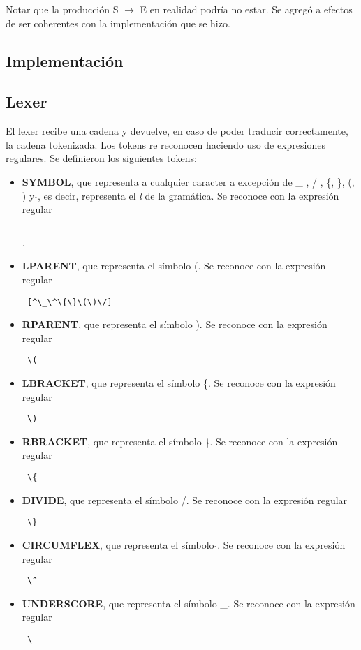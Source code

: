\indent Notar que la producción  S $\rightarrow$ E en realidad podría no estar. Se agregó a efectos de ser coherentes con la implementación que se hizo.\\ 

\subsection{Implementación}

\subsection{Lexer}

\indent \indent El lexer recibe una cadena y devuelve, en caso de poder traducir correctamente, la cadena tokenizada. Los tokens re reconocen haciendo uso de expresiones regulares. Se definieron los siguientes tokens:\\
\begin{itemize}
\item \textbf{SYMBOL}, que representa a cualquier caracter a excepción de \_ , / , \{, \}, (, ) y  $\hat{}$, es decir, representa el \textit{l} de la gramática. Se reconoce con la expresión regular \begin{verbatim} \end{verbatim}.
\item \textbf{LPARENT}, que representa el símbolo (. Se reconoce con la expresión regular \begin{verbatim} [^\_\^\{\}\(\)\/]\end{verbatim}
\item \textbf{RPARENT}, que representa el símbolo ).  Se reconoce con la expresión regular \begin{verbatim} \( \end{verbatim}
\item \textbf{LBRACKET}, que representa el símbolo \{.  Se reconoce con la expresión regular \begin{verbatim} \)\end{verbatim}
\item \textbf{RBRACKET}, que representa el símbolo \}.  Se reconoce con la expresión regular \begin{verbatim} \{\end{verbatim}
\item \textbf{DIVIDE}, que representa el símbolo /.  Se reconoce con la expresión regular \begin{verbatim} \}\end{verbatim}
\item \textbf{CIRCUMFLEX}, que representa el símbolo $\hat{}$.  Se reconoce con la expresión regular \begin{verbatim} \^ \end{verbatim}
\item \textbf{UNDERSCORE}, que representa el símbolo \_.  Se reconoce con la expresión regular \begin{verbatim} \_ \end{verbatim}
\end{itemize}

